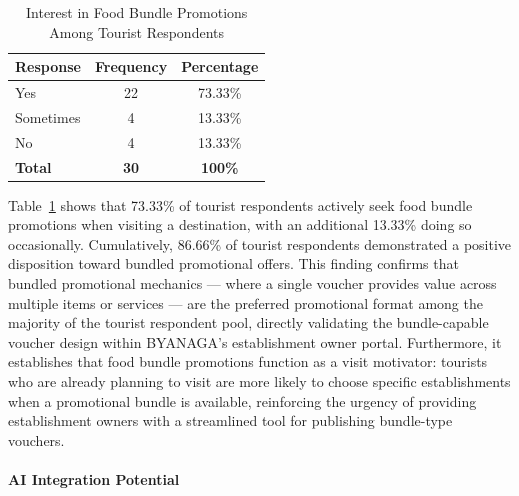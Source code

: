 \documentclass{research}
\begin{document}
\begin{table}[h]
    \centering
    \begin{tabular}{|l|c|c|}
        \hline
        \textbf{Response} & \textbf{Frequency} & \textbf{Percentage} \\
        \hline
        Yes       & 22 & 73.33\% \\
        Sometimes & 4  & 13.33\% \\
        No        & 4  & 13.33\% \\
        \hline
        \textbf{Total} & \textbf{30} & \textbf{100\%} \\
        \hline
    \end{tabular}
    \caption{Interest in Food Bundle Promotions Among Tourist Respondents}
    \label{tab:food_bundle_tourist}
\end{table}

Table~\ref{tab:food_bundle_tourist} shows that 73.33\% of tourist respondents 
actively seek food bundle promotions when visiting a destination, with an 
additional 13.33\% doing so occasionally. Cumulatively, 86.66\% of tourist 
respondents demonstrated a positive disposition toward bundled promotional 
offers. This finding confirms that bundled promotional mechanics --- where a 
single voucher provides value across multiple items or services --- are the 
preferred promotional format among the majority of the tourist respondent pool, 
directly validating the bundle-capable voucher design within BYANAGA's 
establishment owner portal. Furthermore, it establishes that food bundle 
promotions function as a visit motivator: tourists who are already planning to 
visit are more likely to choose specific establishments when a promotional bundle 
is available, reinforcing the urgency of providing establishment owners with a 
streamlined tool for publishing bundle-type vouchers.

\paragraph{AI Integration Potential}
\end{document}
